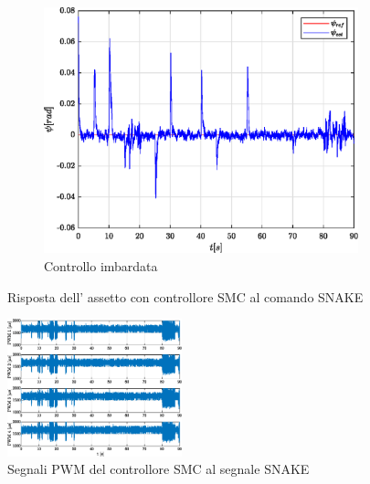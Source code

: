 \begin{figure}
	\hfill
	\begin{subfigure}{0.45\textwidth}
		\centering
		\includegraphics[width=1\textwidth]{Simulazioni/Figure/SMC/SNAKE/AttitudeControlYaw}
		\caption{Controllo imbardata}
		\label{fig:SNAKEyawSMC}
	\end{subfigure}
	\caption{Risposta dell' assetto con controllore SMC al comando SNAKE}
\end{figure}


\begin{figure}
	\centering
	\includegraphics[width=0.45\textwidth]{Simulazioni/Figure/SMC/SNAKE/PWM}
	\caption{Segnali PWM del controllore SMC al segnale SNAKE}
	\label{fig:SNAKEPWMSMC}
\end{figure}

